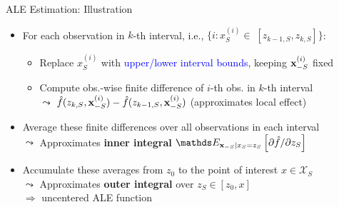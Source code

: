 \documentclass[10pt,compress,t,notes=noshow, xcolor=table]{beamer}
\begin{document}
\begin{frame}{ALE Estimation: Illustration}
\begin{itemize}
\tightlist
\item<1-> For each observation in $k$-th interval, i.e., $\{i: x_S^{(i)} \in \; [z_{k-1, S}, z_{k, S}]\}$:
  \begin{itemize}
    \item Replace $x_S^{(i)}$ with \textcolor{blue}{upper/lower interval bounds}, keeping $\mathbf{x}_{-S}^{(i)}$ fixed
    \item Compute obs.-wise finite difference of $i$-th obs. in $k$-th interval \\
    $\leadsto$ $\hat{f}(z_{k, S}, \mathbf{x}^{(i)}_{-S}) - \hat{f}(z_{k-1, S}, \mathbf{x}^{(i)}_{-S})$  \; (approximates local effect)  %
  \end{itemize}
\item<2-> Average these finite differences over all observations in each interval \\
$\leadsto$ Approximates \textbf{inner integral} \textcolor{red}{\( \E_{\xv_{-S} \mid x_S = z_S} \left[ \partial \hat{f}/\partial z_S \right] \)}
\item<2-> Accumulate these averages from \( z_0 \) to the point of interest \( x \in \mathcal{X}_S \) \\
$\leadsto$ Approximates \textbf{outer integral} over \( z_S \in [z_{0}, x] \) \\$\Rightarrow$ uncentered ALE function

\end{itemize}

\end{frame}


\end{document}
